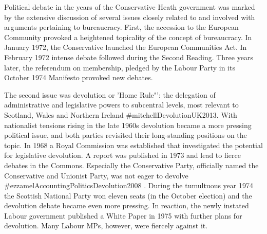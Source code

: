 \documentclass[
]{article}
\begin{document}
Political debate in the years of the Conservative Heath government was
marked by the extensive discussion of several issues closely related to
and involved with arguments pertaining to bureaucracy. First, the
accession to the European Community provoked a heightened topicality of
the concept of bureaucracy. In January 1972, the Conservative launched
the European Communities Act. In February 1972 intense debate followed
during the Second Reading. Three years later, the referendum on
membership, pledged by the Labour Party in its October 1974 Manifesto
provoked new debates.

The second issue was devolution or 'Home Rule"': the delegation of
administrative and legislative powers to subcentral levels, most
relevant to Scotland, Wales and Northern Ireland
\#mitchellDevolutionUK2013. With nationalist tensions rising in the late
1960s devolution became a more pressing political issue, and both
parties revisited their long-standing positions on the topic. In 1968 a
Royal Commission was established that investigated the potential for
legislative devolution. A report was published in 1973 and lead to
fierce debates in the Commons. Especially the Conservative Party,
officially named the Conservative and Unionist Party, was not eager to
devolve \#ezzamelAccountingPoliticsDevolution2008 . During the
tumultuous year 1974 the Scottish National Party won eleven seats (in
the October election) and the devolution debate became even more
pressing. In reaction, the newly instated Labour government published a
White Paper in 1975 with further plans for devolution. Many Labour MPs,
however, were fiercely against it.
\end{document}
